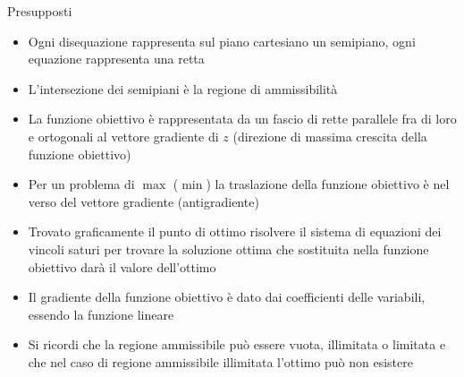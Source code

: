 \documentclass{beamer}
\begin{document}
\begin{frame}[allowframebreaks]{Presupposti}
\begin{itemize}
\item
Ogni disequazione rappresenta sul piano cartesiano un semipiano,
ogni equazione rappresenta una retta

\item
L'intersezione dei semipiani \`e la regione di ammissibilit\`a

\item
La funzione obiettivo \`e rappresentata da un fascio di rette parallele
fra di loro e ortogonali al vettore gradiente di $z$ (direzione di massima
crescita della funzione obiettivo)

\item
Per un problema di $\max$ ($\min$) la traslazione della funzione obiettivo
\`e nel verso del vettore gradiente (antigradiente)

\item
Trovato graficamente il punto di ottimo risolvere il sistema di equazioni dei
vincoli saturi per trovare la soluzione ottima che sostituita nella funzione
obiettivo dar\`a il valore dell'ottimo

\item
Il gradiente della funzione obiettivo \`e dato dai coefficienti delle variabili,
essendo la funzione lineare

\item
Si ricordi che la regione ammissibile pu\`o essere vuota, illimitata o limitata
e che nel caso di regione ammissibile illimitata l'ottimo pu\`o non esistere
\end{itemize}
\end{frame}
\end{document}
